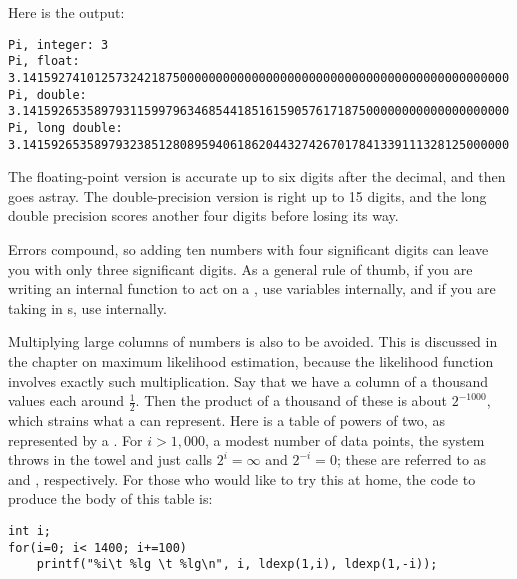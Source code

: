 Here is the output:
\begin{lstlisting}[language={}]
Pi, integer: 3
Pi, float:  3.14159274101257324218750000000000000000000000000000000000000000000000
Pi, double:      3.14159265358979311599796346854418516159057617187500000000000000000000
Pi, long double: 3.14159265358979323851280895940618620443274267017841339111328125000000
\end{lstlisting}
The floating-point version is accurate up to six digits after the
decimal, and then goes astray. The double-precision version is right up to 15
digits, and the long double precision scores another four digits before
losing its way.

Errors compound, so adding ten numbers
with four significant digits can leave you with only three significant
digits. As a general rule of thumb, if you are writing an internal
function to act on a , use  variables internally,
and if you are taking in s, use  internally.

\label{precisionproblem}
Multiplying large columns of numbers is also to be avoided. This is
discussed in the chapter on maximum likelihood estimation, because the
likelihood function involves exactly such multiplication. Say that we
have a column of a thousand values each around $\frac{1}{2}$. Then the
product of a thousand of these is about $2^{-1000}$, which strains what
a  can represent. Here is a table of powers of two, as
represented by a . For $i>1,000$, a
modest number of data points, the system throws in the towel and just
calls $2^i = \infty$ and $2^{-i} = 0$; these are referred to as
 and , respectively. For those who would like
to try this at home, the code to produce the body of this table is:
\begin{lstlisting}
int i;
for(i=0; i< 1400; i+=100)
    printf("%i\t %lg \t %lg\n", i, ldexp(1,i), ldexp(1,-i));
\end{lstlisting}


